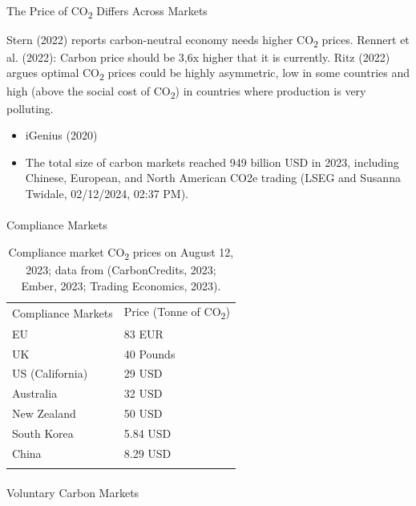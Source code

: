\documentclass[
  letterpaper,
  DIV=11,
  numbers=noendperiod]{scrartcl}
\makeatletter
\let\oldparagraph\paragraph
\renewcommand{\paragraph}{
    \@ifstar
      \xxxParagraphStar
      \xxxParagraphNoStar
  }
\newcommand{\xxxParagraphStar}[1]{\oldparagraph*{#1}\mbox{}}
\newcommand{\xxxParagraphNoStar}[1]{\oldparagraph{#1}\mbox{}}
\providecommand{\tightlist}{%
  \setlength{\itemsep}{0pt}\setlength{\parskip}{0pt}}\usepackage{longtable,booktabs,array}
\makeatother
\begin{document}
\paragraph{\texorpdfstring{The Price of CO\textsubscript{2} Differs
Across
Markets}{The Price of CO2 Differs Across Markets}}\label{the-price-of-co2-differs-across-markets}

Stern (2022) reports carbon-neutral economy needs higher
CO\textsubscript{2} prices. Rennert et al. (2022): Carbon price should
be 3,6x higher that it is currently. Ritz (2022) argues optimal
CO\textsubscript{2} prices could be highly asymmetric, low in some
countries and high (above the social cost of CO\textsubscript{2}) in
countries where production is very polluting.

\begin{itemize}
\tightlist
\item
  iGenius (2020)
\item
  The total size of carbon markets reached 949 billion USD in 2023,
  including Chinese, European, and North American CO2e trading (LSEG and
  Susanna Twidale, 02/12/2024, 02:37 PM).
\end{itemize}

\paragraph{Compliance Markets}\label{compliance-markets}

\begin{longtable}[]{@{}ll@{}}
\caption{Compliance market CO\textsubscript{2} prices on August 12,
2023; data from (CarbonCredits, 2023; Ember, 2023; Trading Economics,
2023).}\tabularnewline
\toprule\noalign{}
\endfirsthead
\endhead
\bottomrule\noalign{}
\endlastfoot
Compliance Markets & Price (Tonne of CO\textsubscript{2}) \\
EU & 83 EUR \\
UK & 40 Pounds \\
US (California) & 29 USD \\
Australia & 32 USD \\
New Zealand & 50 USD \\
South Korea & 5.84 USD \\
China & 8.29 USD \\
& \\
\end{longtable}

\paragraph{Voluntary Carbon Markets}\label{voluntary-carbon-markets}
\end{document}
